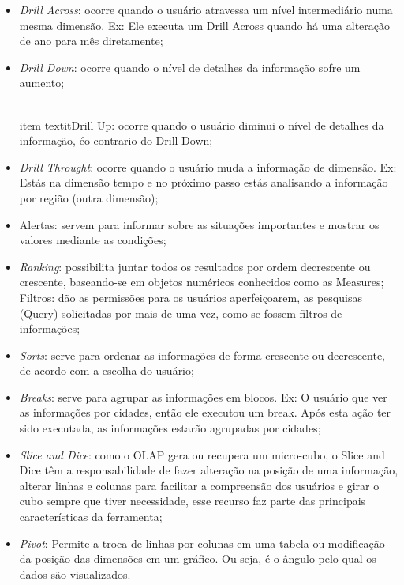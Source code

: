 \begin{itemize}

    \item \textit{Drill Across}: ocorre quando o usu\'{a}rio atravessa um n\'{i}vel intermedi\'{a}rio numa mesma dimens\~{a}o. Ex: Ele executa um Drill Across quando h\'{a} uma altera\c{c}\~{a}o de ano para mês diretamente;

    \item \textit{Drill Down}: ocorre quando o n\'{i}vel de detalhes da informa\c{c}\~{a}o sofre um aumento;
    
    \\item textit{Drill Up}: ocorre quando o usu\'{a}rio diminui o n\'{i}vel de detalhes da informa\c{c}\~{a}o, \'{e}o contrario do Drill Down;
    
    \item \textit{Drill Throught}: ocorre quando o usu\'{a}rio muda a informa\c{c}\~{a}o de dimens\~{a}o. Ex: Est\'{a}s na dimens\~{a}o tempo e no pr\'{o}ximo passo est\'{a}s analisando a informa\c{c}\~{a}o por regi\~{a}o (outra dimens\~{a}o);
    
    \item Alertas: servem para informar sobre as situa\c{c}\~{o}es importantes e mostrar os valores mediante as condi\c{c}\~{o}es;
    
    \item \textit{Ranking}: possibilita juntar todos os resultados por ordem decrescente ou crescente, baseando-se em objetos num\'{e}ricos conhecidos como as Measures;
    Filtros: d\~{a}o as permiss\~{o}es para os usu\'{a}rios aperfei\c{c}oarem, as pesquisas (Query) solicitadas por mais de uma vez, como se fossem filtros de informa\c{c}\~{o}es;
    
    \item \textit{Sorts}: serve para ordenar as informa\c{c}\~{o}es de forma crescente ou decrescente, de acordo com a escolha do usu\'{a}rio;
    
    \item \textit{Breaks}: serve para agrupar as informa\c{c}\~{o}es em blocos. Ex: O usu\'{a}rio que ver as informa\c{c}\~{o}es por cidades, ent\~{a}o ele executou um break. Ap\'{o}s esta a\c{c}\~{a}o ter sido executada, as informa\c{c}\~{o}es estar\~{a}o agrupadas por cidades;
    
    \item \textit{Slice and Dice}: como o OLAP gera ou recupera um micro-cubo, o Slice and Dice têm a responsabilidade de fazer altera\c{c}\~{a}o na posi\c{c}\~{a}o de uma informa\c{c}\~{a}o, alterar linhas e colunas para facilitar a compreens\~{a}o dos usu\'{a}rios e girar o cubo sempre que tiver necessidade, esse recurso faz parte das principais caracter\'{i}sticas da ferramenta;
    
    \item \textit{Pivot}: Permite a troca de linhas por colunas em uma tabela ou modifica\c{c}\~{a}o da posi\c{c}\~{a}o das dimens\~{o}es em um gr\'{a}fico. Ou seja, \'{e} o ângulo pelo qual os dados s\~{a}o visualizados.
    
\end{itemize}

